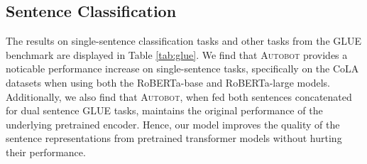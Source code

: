 


\subsection{Sentence Classification} \label{sec:clf}

The results on single-sentence classification tasks and other tasks from the GLUE benchmark are displayed in Table \ref{tab:glue}. We find that \textsc{Autobot} provides a 
noticable performance increase on single-sentence tasks, specifically on the CoLA datasets when using both the RoBERTa-base and RoBERTa-large models.
Additionally, we also find that \textsc{Autobot}, when fed both sentences concatenated for dual sentence GLUE tasks, maintains the original performance of the underlying pretrained encoder. Hence, our model improves the quality of the sentence representations from pretrained transformer models without hurting their performance.  





